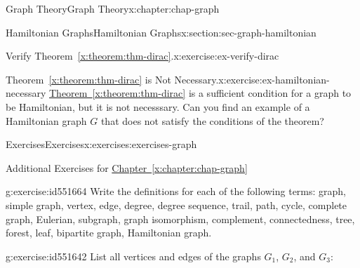 \documentclass[oneside,10pt,]{book}
\newcommand{\xreffont}{\relax}
\numberwithin{equation}{section}
\begin{document}
\begin{chapterptx}{Graph Theory}{}{Graph Theory}{}{}{x:chapter:chap-graph}
\begin{sectionptx}{Hamiltonian Graphs}{}{Hamiltonian Graphs}{}{}{x:section:sec-graph-hamiltonian}
\begin{inlineexercise}{Verify Theorem~{\xreffont\ref*{x:theorem:thm-dirac}}.}{x:exercise:ex-verify-dirac}
\begin{sidebyside}{1}{0.325}{0.325}{0}
\begin{sbspanel}{0.35}
{
}%
\end{sbspanel}%
\end{sidebyside}%
\end{inlineexercise}%
\begin{inlineexercise}{Theorem~{\xreffont\ref*{x:theorem:thm-dirac}} is Not Necessary.}{x:exercise:ex-hamiltonian-necessary}%
\hyperref[x:theorem:thm-dirac]{Theorem~{\xreffont\ref{x:theorem:thm-dirac}}} is a sufficient condition for a graph to be Hamiltonian, but it is not necesssary. Can you find an example of a Hamiltonian graph \(G\) that does not satisfy the conditions of the theorem?%
\end{inlineexercise}%
\end{sectionptx}
%
%
\typeout{************************************************}
\typeout{************************************************}
%
\begin{exercises-section}{Exercises}{}{Exercises}{}{}{x:exercises:exercises-graph}
\begin{introduction}{}%
Additional Exercises for \hyperref[x:chapter:chap-graph]{Chapter~{\xreffont\ref{x:chapter:chap-graph}}}%
\end{introduction}%
\begin{divisionexercise}{1}{}{}{g:exercise:id551664}%
Write the definitions for each of the following terms: graph, simple graph, vertex, edge, degree, degree sequence, trail, path, cycle, complete graph, Eulerian, subgraph, graph isomorphism, complement, connectedness, tree, forest, leaf, bipartite graph, Hamiltonian graph.%
\end{divisionexercise}%
\begin{divisionexercise}{2}{}{}{g:exercise:id551642}%
List all vertices and edges of the graphs \(G_1\), \(G_2\), and \(G_3\):%
\begin{sidebyside}{3}{0.0516666666666667}{0.0516666666666667}{0.103333333333333}%

\end{sidebyside}
\end{divisionexercise}
\end{exercises-section}
\end{chapterptx}
\end{document}
